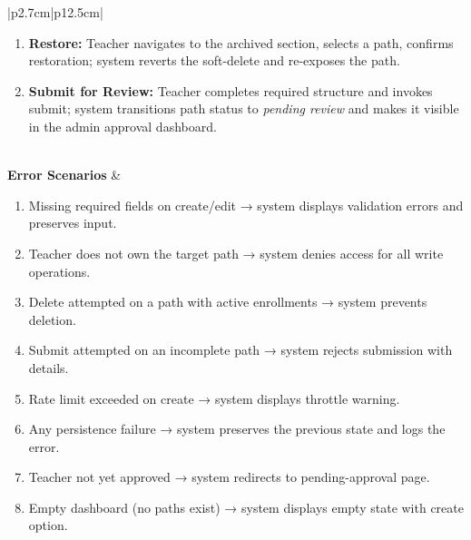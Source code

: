 \begin{table}[H]
\begin{tabular}{|p{2.7cm}|p{12.5cm}|}
\begin{minipage}[t]{\linewidth}
\begin{enumerate}[topsep=0pt,itemsep=1pt,parsep=0pt,partopsep=0pt]
                \item \textbf{Restore:} Teacher navigates to the archived section, selects a path, confirms restoration; system reverts the soft-delete and re-exposes the path.
                \item \textbf{Submit for Review:} Teacher completes required structure and invokes submit; system transitions path status to \textit{pending review} and makes it visible in the admin approval dashboard.
            \end{enumerate}
        \end{minipage} \\
        \hline
        \textbf{Error Scenarios} &
        \begin{minipage}[t]{\linewidth}
            \begin{enumerate}[topsep=0pt,itemsep=1pt,parsep=0pt,partopsep=0pt]
                \item Missing required fields on create/edit → system displays validation errors and preserves input.
                \item Teacher does not own the target path → system denies access for all write operations.
                \item Delete attempted on a path with active enrollments → system prevents deletion.
                \item Submit attempted on an incomplete path → system rejects submission with details.
                \item Rate limit exceeded on create → system displays throttle warning.
                \item Any persistence failure → system preserves the previous state and logs the error.
                \item Teacher not yet approved → system redirects to pending-approval page.
                \item Empty dashboard (no paths exist) → system displays empty state with create option.
            \end{enumerate}
        \end{minipage} \\
        \hline
    \end{tabular}
    \label{tab:teacher-manage-tp}
\end{table}
